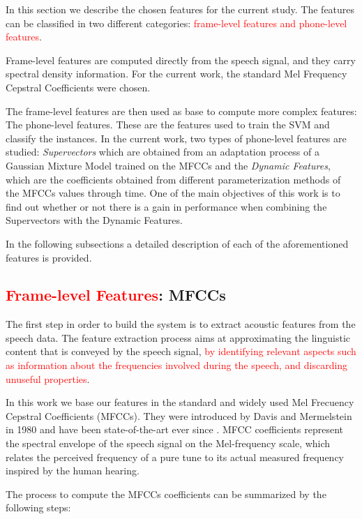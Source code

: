 In this section we describe the chosen features for the current study. The features can be classified in two different categories: \textcolor{red}{frame-level features and
phone-level features}.

Frame-level features are computed directly from the speech signal, and they carry spectral density information. For the current work, the standard Mel Frequency Cepstral Coefficients
were chosen.

The frame-level features are then used as base to compute more complex features:
The phone-level features. These
are the features used to train the SVM and classify the instances. In the current work, two
types of phone-level features are studied: \textit{Supervectors}
which are obtained from an adaptation process of
a Gaussian Mixture Model trained on the MFCCs and the \textit{Dynamic Features},
which are
the coefficients obtained from different parameterization methods of the MFCCs values through time.
One of the main objectives of this work is to find out whether or not there is a gain in performance
when combining the Supervectors with the Dynamic Features.

In the following subsections a detailed description of each of the aforementioned features is
provided.

\subsection{\textcolor{red}{Frame-level Features}: MFCCs}

The first step in order to build the system is to extract acoustic features from the speech data.
The feature extraction process aims at approximating the linguistic content that is conveyed
by the speech signal, \textcolor{red}{by identifying relevant aspects such as information about
the frequencies involved during the speech, and discarding unuseful properties}.

In this work we base our features in the standard and widely used Mel Frecuency
Cepstral Coefficients (MFCCs). They were introduced by Davis and Mermelstein in 1980 and
have been state-of-the-art ever since \cite{mfcc_foundational}.
MFCC coefficients represent the spectral envelope of the speech signal on the Mel-frequency scale,
which relates the perceived frequency of a pure tune to its actual measured frequency inspired
by the human hearing.

The process to compute the MFCCs coefficients can be summarized by the following steps:

